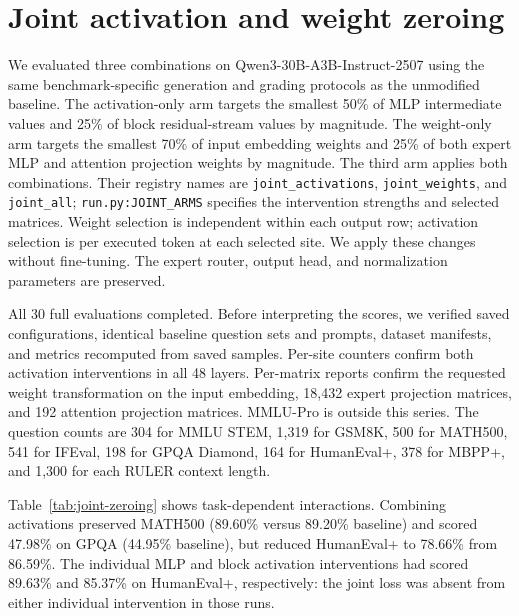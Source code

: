 \section{Joint activation and weight zeroing}
\label{sec:joint-zeroing}
We evaluated three combinations on Qwen3-30B-A3B-Instruct-2507 using the same
benchmark-specific generation and grading protocols as the unmodified baseline.
The activation-only arm targets the smallest 50\% of MLP intermediate values
and 25\% of block residual-stream values by magnitude. The weight-only arm
targets the smallest 70\% of input embedding weights and 25\% of both expert
MLP and attention projection weights by magnitude. The third arm
applies both combinations. Their registry names are
\texttt{joint\_activations}, \texttt{joint\_weights}, and \texttt{joint\_all};
\texttt{run.py:JOINT\_ARMS} specifies the intervention strengths and selected
matrices. Weight selection is independent within each output row; activation
selection is per executed token at each selected site. We apply these changes
without fine-tuning. The expert router, output head, and normalization parameters
are preserved.

All 30 full evaluations completed. Before interpreting the scores, we verified
saved configurations, identical baseline question sets and prompts, dataset
manifests, and metrics recomputed from saved samples. Per-site counters confirm
both activation interventions in all 48 layers. Per-matrix reports confirm the
requested weight transformation on the input embedding, 18,432 expert projection
matrices, and 192 attention projection matrices. MMLU-Pro is outside this series.
The question counts are 304 for MMLU STEM, 1,319 for GSM8K, 500 for MATH500,
541 for IFEval, 198 for GPQA Diamond, 164 for HumanEval+, 378 for MBPP+, and
1,300 for each RULER context length.

\begin{table}[ht]
\centering
\caption{Joint-zeroing benchmark scores (\%). IFEval uses strict prompt accuracy;
HumanEval+ and MBPP+ use pass@1 on the extended tests. RULER reports mean
sample scores, including partial credit. Each column uses its own baseline.}
\label{tab:joint-zeroing}

\end{table}

Table~\ref{tab:joint-zeroing} shows task-dependent interactions.
Combining activations preserved MATH500 (89.60\% versus 89.20\% baseline) and
scored 47.98\% on GPQA (44.95\% baseline), but reduced HumanEval+ to 78.66\%
from 86.59\%. The individual MLP and block activation interventions had scored
89.63\% and 85.37\% on HumanEval+, respectively: the joint loss was absent
from either individual intervention in those runs.

